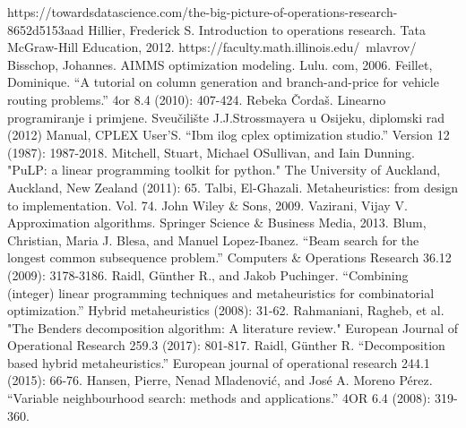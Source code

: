 \documentclass[a4paper, utf8, 11pt, colorlinks]{book}
\begin{document}
\begin{thebibliography}{widest entry}
	  {https://towardsdatascience.com/the-big-picture-of-operations-research-8652d5153aad}
	 Hillier, Frederick S. Introduction to operations research. Tata McGraw-Hill Education, 2012.
	  https://faculty.math.illinois.edu/~mlavrov/
	   Bisschop, Johannes. AIMMS optimization modeling. Lulu. com, 2006.
	   Feillet, Dominique. ``A tutorial on column generation and branch-and-price for vehicle routing problems.'' 4or 8.4 (2010): 407-424.
	    Rebeka Čordaš. Linearno programiranje i primjene. Sveu\v cili\v ste J.J.Strossmayera u Osijeku, diplomski rad (2012)
	     Manual, CPLEX User’S. ``Ibm ilog cplex optimization studio.'' Version 12 (1987): 1987-2018.
	   Mitchell, Stuart, Michael OSullivan, and Iain Dunning. "PuLP: a linear programming toolkit for python." The University of Auckland, Auckland, New Zealand (2011): 65.
	      Talbi, El-Ghazali. Metaheuristics: from design to implementation. Vol. 74. John Wiley \& Sons, 2009.
	       Vazirani, Vijay V. Approximation algorithms. Springer Science \& Business Media, 2013.
	        Blum, Christian, Maria J. Blesa, and Manuel Lopez-Ibanez. ``Beam search for the longest common subsequence problem.'' Computers \& Operations Research 36.12 (2009): 3178-3186.
	      Raidl, Günther R., and Jakob Puchinger. ``Combining (integer) linear programming techniques and metaheuristics for combinatorial optimization.'' Hybrid metaheuristics (2008): 31-62.
	           Rahmaniani, Ragheb, et al. "The Benders decomposition algorithm: A literature review." European Journal of Operational Research 259.3 (2017): 801-817.
	         Raidl, Günther R. ``Decomposition based hybrid metaheuristics.'' European journal of operational research 244.1 (2015): 66-76.
	        Hansen, Pierre, Nenad Mladenović, and José A. Moreno Pérez. ``Variable neighbourhood search: methods and applications.'' 4OR 6.4 (2008): 319-360.
\end{thebibliography}
\end{document}

